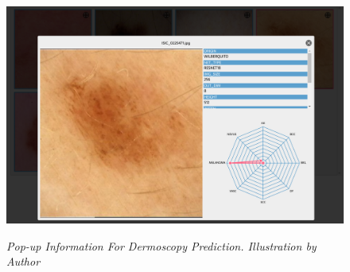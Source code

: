 \begin{figure}[H]
  \centering
  \includegraphics[width=\textwidth]{imatges/results/extra-inf-popup.png}
  \caption[Pop-up Information For Dermoscopy Prediction]{\textit{Pop-up Information For Dermoscopy Prediction. Illustration by Author}}
  {\label{fig:extra-inf-popup}}
\end{figure}
